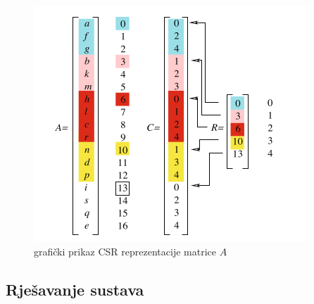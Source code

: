 \documentclass[zavrsnirad]{../fer}
\begin{document}
\begin{figure}[htb]
	\centering
	\includegraphics[width=0.7\linewidth]{Figures/CSR.png}
	\caption{grafički prikaz CSR reprezentacije matrice $A$}
	\label{CSR}
\end{figure}


\subsection{Rješavanje sustava}
\end{document}
